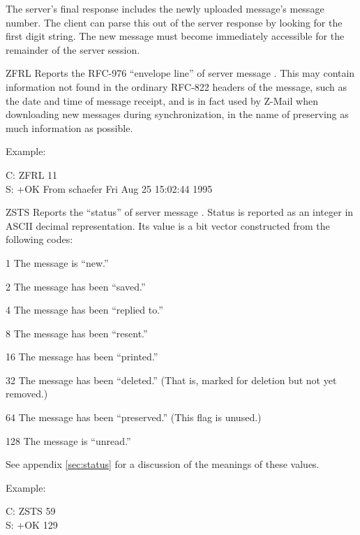 \begin{codelist}
The server's final response includes the newly uploaded message's
message number.  The client can parse this out of the server response
by looking for the first digit string.  The new message must become
immediately accessible for the remainder of the server session.

\item[ZFRL \var{m}] Reports the RFC-976 ``envelope 
line'' of server message .  This may contain information not
found in the ordinary RFC-822 headers of the message, such as the date
and time of message receipt, and is in fact used by Z-Mail when
downloading new messages during synchronization, in the name of
preserving as much information as possible.

Example:

\begin{conversation}
C: ZFRL 11 \\
S: +OK From schaefer  Fri Aug 25 15:02:44 1995
\end{conversation}

\item[ZSTS \var{m}] Reports the ``status'' of server message .
Status is reported as an integer in ASCII decimal representation.  Its
value is a bit vector constructed from the following codes:

\begin{list}{}{%
  \setlength{\itemsep}{0pt}
  \settowidth{\labelwidth}{128}}
\item[1] The message is ``new.''
\item[2] The message has been ``saved.''
\item[4] The message has been ``replied to.''
\item[8] The message has been ``resent.''
\item[16] The message has been ``printed.''
\item[32] The message has been ``deleted.''  (That is, marked for
deletion but not yet removed.)
\item[64] The message has been ``preserved.''  (This flag is unused.)
\item[128] The message is ``unread.''
\end{list}

See appendix \ref{sec:status} for a discussion of the meanings of
these values.

Example:

\begin{conversation}
C: ZSTS 59 \\
S: +OK 129
\end{conversation}


\end{codelist}
